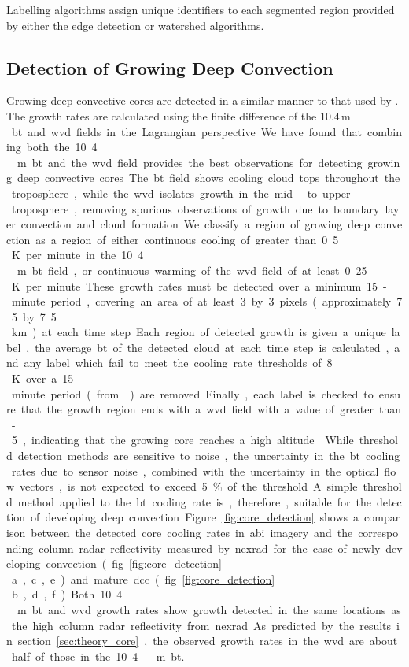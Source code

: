 Labelling algorithms assign unique identifiers to each segmented region provided by either the edge detection or watershed algorithms.


\subsection{Detection of Growing Deep Convection} \label{sec:core_detection}

Growing deep convective cores are detected in a similar manner to that used by \citet{zinner_cb-tram_2008}.
The growth rates are calculated using the finite difference of the 10.4\,\unit{\mu m } \acrshort{bt} and \acrshort{wvd} fields in the Lagrangian perspective.
We have found that combining both the 10.4\,\unit{\mu m} \acrshort{bt} and the \acrshort{wvd} field provides the best observations for detecting growing deep convective cores.
The \acrshort{bt} field shows cooling cloud tops throughout the troposphere, while the \acrshort{wvd} isolates growth in the mid- to upper-troposphere, removing spurious observations of growth due to boundary layer convection and cloud formation.

We classify a region of growing deep convection as a region of either continuous cooling of greater than 0.5\,\unit{K} per minute in the 10.4\,\unit{\mu m} \acrshort{bt} field, or continuous warming of the \acrshort{wvd} field of at least 0.25\,\unit{K} per minute.
These growth rates must be detected over a minimum 15-minute period, covering an area of at least 3 by 3 pixels (approximately 7.5 by 7.5\,\unit{km}) at each time step.
Each region of detected growth is given a unique label, the average \acrshort{bt} of the detected cloud at each time step is calculated, and any label which fail to meet the cooling rate thresholds of 8\,\unit{K} over a 15-minute period (from \citep{roberts_nowcasting_2003, hartung_intercomparison_2013}) are removed.
Finally, each label is checked to ensure that the growth region ends with a \acrshort{wvd} field with a value of greater than -5, indicating that the growing core reaches a high altitude \citep{muller_role_2018}.
While threshold detection methods are sensitive to noise, the uncertainty in the \acrshort{bt} cooling rates due to sensor noise, combined with the uncertainty in the optical flow vectors, is not expected to exceed 5\% of the threshold.
A simple threshold method applied to the \acrshort{bt} cooling rate is, therefore, suitable for the detection of developing deep convection.

Figure~\ref{fig:core_detection} shows a comparison between the detected core cooling rates in \acrshort{abi} imagery and the corresponding column radar reflectivity measured by \acrshort{nexrad} for the case of newly developing convection (fig.~\ref{fig:core_detection}\,a,c,e) and mature \acrshort{dcc} (fig.~\ref{fig:core_detection}\,b,d,f)
Both 10.4\,\unit{\mu m} \acrshort{bt} and \acrshort{wvd} growth rates show growth detected in the same locations as the high column radar reflectivity from \acrshort{nexrad}.
As predicted by the results in section~\ref{sec:theory_core}, the observed growth rates in the \acrshort{wvd} are about half of those in the 10.4\,\unit{\mu m} \acrshort{bt}.


